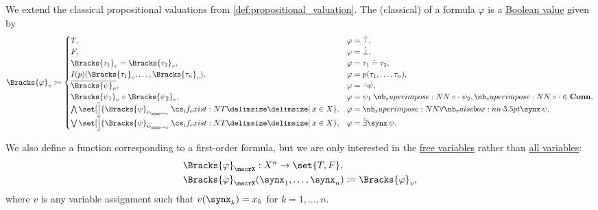 \begin{definition}
\begin{thmenum}
     We extend the classical propositional valuations from \cref{def:propositional_valuation}. The (classical)  of a formula \( \varphi \) is a \hyperref[con:boolean_value]{Boolean value} given by
    \begin{equation}\label{eq:def:first_order_valuation/formula_valuation}
      \Bracks{\varphi}_v \coloneqq \begin{cases}
        T,                                                                        &\varphi = \syntop, \\
        F,                                                                        &\varphi = \synbot, \\
        \Bracks{\tau_1}_v = \Bracks{\tau_2}_v,                                    &\varphi = \tau_1 \syneq \tau_2, \\
        I(p)(\Bracks{\tau_1}_v, \ldots, \Bracks{\tau_n}_v),                       &\varphi = p(\tau_1, \ldots, \tau_n), \\
        \oline{\Bracks{\psi}_v},                                               &\varphi = \synneg \psi, \\
        \Bracks{\psi_1}_v \relcirc \Bracks{\psi_2}_v,                    &\varphi = \psi_1 \syncirc \psi_2, {\syncirc} \in \op*{Conn}, \\
        \bigwedge\set[\Big]{ \Bracks{\psi}_{v_{\synx \mapsto x}} \given* x \in X }, &\varphi = \qforall \synx \psi, \\
        \bigvee\set[\Big]{ \Bracks{\psi}_{v_{\synx \mapsto x}} \given* x \in X },   &\varphi = \qexists \synx \psi.
      \end{cases}
    \end{equation}

     We also define a function corresponding to a first-order formula, but we are only interested in the \hyperref[def:first_order_syntax/formula_free_variables]{free variables} rather than \hyperref[def:first_order_syntax/formula_variables]{all variables}:
    \begin{equation*}
      \begin{aligned}
        &\Bracks{\varphi}_\mscrX: X^n \to \set{ T, F }, \\
        &\Bracks{\varphi}_\mscrX(\synx_1, \ldots, \synx_n) \coloneqq \Bracks{\varphi}_v,
      \end{aligned}
    \end{equation*}
    where \( v \) is any variable assignment such that \( v(\synx_k) = x_k \) for \( k = 1, \ldots, n \).
  \end{thmenum}
\end{definition}
